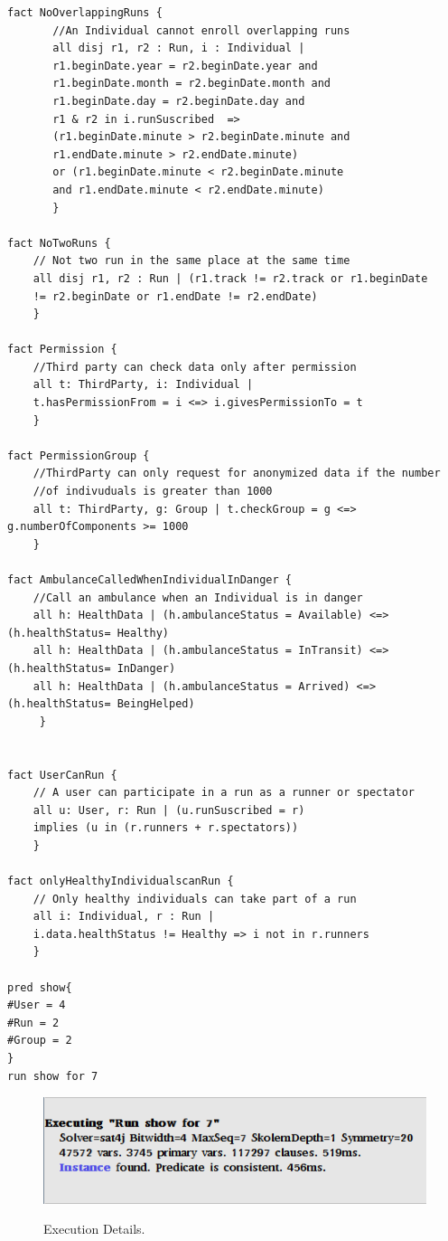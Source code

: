 \documentclass[12pt]{article}
\begin{document}
\begin{verbatim}
fact NoOverlappingRuns { 
       //An Individual cannot enroll overlapping runs 
       all disj r1, r2 : Run, i : Individual | 
       r1.beginDate.year = r2.beginDate.year and 
       r1.beginDate.month = r2.beginDate.month and 
       r1.beginDate.day = r2.beginDate.day and
       r1 & r2 in i.runSuscribed  => 
       (r1.beginDate.minute > r2.beginDate.minute and 
       r1.endDate.minute > r2.endDate.minute) 
       or (r1.beginDate.minute < r2.beginDate.minute 
       and r1.endDate.minute < r2.endDate.minute)
       }

fact NoTwoRuns {
	// Not two run in the same place at the same time 
 	all disj r1, r2 : Run | (r1.track != r2.track or r1.beginDate 
 	!= r2.beginDate or r1.endDate != r2.endDate) 
	} 

fact Permission { 
	//Third party can check data only after permission
	all t: ThirdParty, i: Individual |  
	t.hasPermissionFrom = i <=> i.givesPermissionTo = t  
	}

fact PermissionGroup {
	//ThirdParty can only request for anonymized data if the number 
	//of indivuduals is greater than 1000
	all t: ThirdParty, g: Group | t.checkGroup = g <=> g.numberOfComponents >= 1000 
	} 

fact AmbulanceCalledWhenIndividualInDanger { 
	//Call an ambulance when an Individual is in danger
	all h: HealthData | (h.ambulanceStatus = Available) <=> (h.healthStatus= Healthy)
	all h: HealthData | (h.ambulanceStatus = InTransit) <=> (h.healthStatus= InDanger) 
	all h: HealthData | (h.ambulanceStatus = Arrived) <=> (h.healthStatus= BeingHelped) 
     }


fact UserCanRun {
	// A user can participate in a run as a runner or spectator 
	all u: User, r: Run | (u.runSuscribed = r) 
	implies (u in (r.runners + r.spectators)) 
	}

fact onlyHealthyIndividualscanRun { 
	// Only healthy individuals can take part of a run
	all i: Individual, r : Run | 
	i.data.healthStatus != Healthy => i not in r.runners 
	} 

pred show{ 
#User = 4
#Run = 2
#Group = 2 
} 
run show for 7

\end{verbatim}

\begin{figure}[H]
\centering
\includegraphics[scale=0.8]{alloy_run.png}
\label{fig:alloy_run}
\caption{Execution Details.}
\end{figure}
\end{document}
